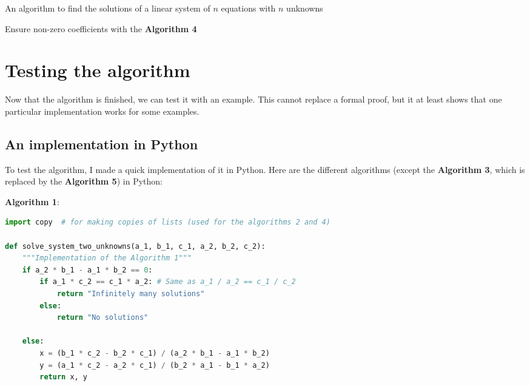 \documentclass[11pt]{article}
\begin{document}
\begin{algorithm}
\caption{An algorithm to find the solutions of a linear system of $n$ equations with $n$ unknowns}
    Ensure non-zero coefficients with the \textbf{Algorithm 4}\;
\end{algorithm}

\pagebreak

\section{Testing the algorithm}

Now that the algorithm is finished, we can test it with an example.
This cannot replace a formal proof, but it at least shows that one particular implementation works for some examples.

\subsection{An implementation in Python}

To test the algorithm, I made a quick implementation of it in Python.
Here are the different algorithms (except the \textbf{Algorithm 3}, which is replaced by the \textbf{Algorithm 5}) in Python:

\vspace{8mm}

\textbf{Algorithm 1}:

\begin{lstlisting}[language=Python]
import copy  # for making copies of lists (used for the algorithms 2 and 4)

def solve_system_two_unknowns(a_1, b_1, c_1, a_2, b_2, c_2):
    """Implementation of the Algorithm 1"""
    if a_2 * b_1 - a_1 * b_2 == 0:
        if a_1 * c_2 == c_1 * a_2: # Same as a_1 / a_2 == c_1 / c_2
            return "Infinitely many solutions"
        else:
            return "No solutions"

    else:
        x = (b_1 * c_2 - b_2 * c_1) / (a_2 * b_1 - a_1 * b_2)
        y = (a_1 * c_2 - a_2 * c_1) / (b_2 * a_1 - b_1 * a_2)
        return x, y
\end{lstlisting}
\end{document}
